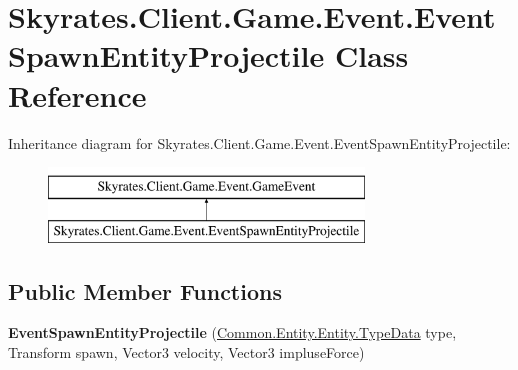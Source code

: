 \hypertarget{class_skyrates_1_1_client_1_1_game_1_1_event_1_1_event_spawn_entity_projectile}{\section{Skyrates.\-Client.\-Game.\-Event.\-Event\-Spawn\-Entity\-Projectile Class Reference}
\label{class_skyrates_1_1_client_1_1_game_1_1_event_1_1_event_spawn_entity_projectile}
}
Inheritance diagram for Skyrates.\-Client.\-Game.\-Event.\-Event\-Spawn\-Entity\-Projectile\-:\begin{figure}[H]
\begin{center}
\leavevmode
\includegraphics[height=2.000000cm]{class_skyrates_1_1_client_1_1_game_1_1_event_1_1_event_spawn_entity_projectile}
\end{center}
\end{figure}
\subsection*{Public Member Functions}
\begin{DoxyCompactItemize}
\item 
\hypertarget{class_skyrates_1_1_client_1_1_game_1_1_event_1_1_event_spawn_entity_projectile_a1bd9977802e5e0737c5a9af679b54d5a}{{\bfseries Event\-Spawn\-Entity\-Projectile} (\hyperlink{class_skyrates_1_1_common_1_1_entity_1_1_entity_1_1_type_data}{Common.\-Entity.\-Entity.\-Type\-Data} type, Transform spawn, Vector3 velocity, Vector3 impluse\-Force)}\label{class_skyrates_1_1_client_1_1_game_1_1_event_1_1_event_spawn_entity_projectile_a1bd9977802e5e0737c5a9af679b54d5a}

\end{DoxyCompactItemize}
